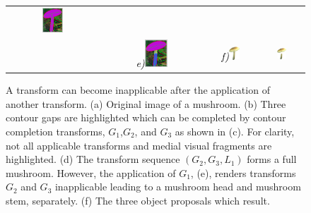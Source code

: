 \begin{figure}[ht]
\begin{tabular}{cccc}
\includegraphics[width=0.242\textwidth]{figs/mushroom_t4.pdf}\\
&
{\footnotesize\textit{\textcolor{black}{e)}}}\includegraphics[width=0.242\textwidth]{figs/mushroom_t1.pdf}&
{\footnotesize\textit{\textcolor{black}{f)}}}\includegraphics[width=0.242\textwidth]{figs/mushroom_full_t4.png}&
\includegraphics[width=0.242\textwidth]{figs/mushroom_combine.png} \\
\end{tabular}
\caption{A transform can become inapplicable after the application of another transform. (a) Original image of a mushroom. (b) Three contour gaps are highlighted which can be completed by contour completion transforms, $G_1$,$G_2$, and $G_3$ as shown in (c). For clarity, not all applicable transforms and medial visual fragments are highlighted. (d) The transform sequence $(G_2,G_3,L_1)$ forms a full mushroom. However, the application of $G_1$, (e), renders transforms $G_2$ and $G_3$ inapplicable leading to a mushroom head and mushroom stem, separately. (f) The three object proposals which result.} 

\end{figure}
